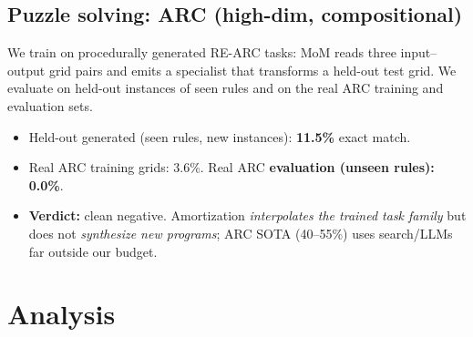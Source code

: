 \documentclass[11pt]{article}
\begin{document}
\subsection{Puzzle solving: ARC (high-dim, compositional)}
We train on procedurally generated RE-ARC tasks: MoM reads three input--output grid
pairs and emits a specialist that transforms a held-out test grid. We evaluate on
held-out instances of seen rules and on the real ARC training and evaluation sets.
\begin{itemize}[leftmargin=1.4em]
  \item Held-out generated (seen rules, new instances): \textbf{11.5\%} exact match.
  \item Real ARC training grids: 3.6\%. \quad Real ARC \textbf{evaluation (unseen
        rules): 0.0\%}.
  \item \textbf{Verdict:} clean negative. Amortization \emph{interpolates the trained
        task family} but does not \emph{synthesize new programs}; ARC SOTA (40--55\%)
        uses search/LLMs far outside our budget.
\end{itemize}

\section{Analysis}
\end{document}
